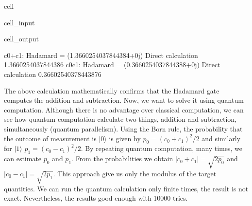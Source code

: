 \documentclass[letterpaper,10pt,english]{jupyterBook}
\begin{document}
\begin{sphinxuseclass}{cell}
\begin{sphinxVerbatimInput}
\begin{sphinxuseclass}{cell_input}
\begin{sphinxVerbatim}[commandchars=\\\{\}]
\PYG{p}{[}\PYG{p}{]}
\PYG{p}{[}\PYG{p}{]}
\end{sphinxVerbatim}

\end{sphinxuseclass}\end{sphinxVerbatimInput}
\begin{sphinxVerbatimOutput}

\begin{sphinxuseclass}{cell_output}
\begin{sphinxVerbatim}[commandchars=\\\{\}]
c0+c1: Hadamard =  (1.3660254037844384+0j)    Direct calculation 1.3660254037844386
c0\PYGZhy{}c1: Hadamard =  (0.3660254037844388+0j)    Direct calculation 0.36602540378443876
\end{sphinxVerbatim}

\end{sphinxuseclass}\end{sphinxVerbatimOutput}

\end{sphinxuseclass}
\sphinxAtStartPar
The above calculation mathematically confirms that the Hadamard gate computes the addition and subtraction.  Now, we want to solve it using quantum computation. Although there is no advantage over classical computation, we can see how quantum computation calculate two things, addition and subtraction, simultaneously (quantum parallelism). Using the  Born rule, the probability that the outcome of measurement is \(|0\rangle\) is given by \(p_0 = (c_0+c_1)^2/2\) and similarly for \(|1\rangle\) \(p_1 = (c_0-c_1)^2/2\).  By repeating quantum computation, many times, we can estimate \(p_0\) and \(p_1\).  From the probabilities we obtain \(|c_0 + c_1| = \sqrt{2 p_0}\) and \(|c_0-c_1| = \sqrt{2 p_1}\).  This approach give us only the modulus of the target quantities.  We can run the quantum calculation only finite times, the result is not exact.  Nevertheless, the results good enough with 10000 tries.
\end{document}
